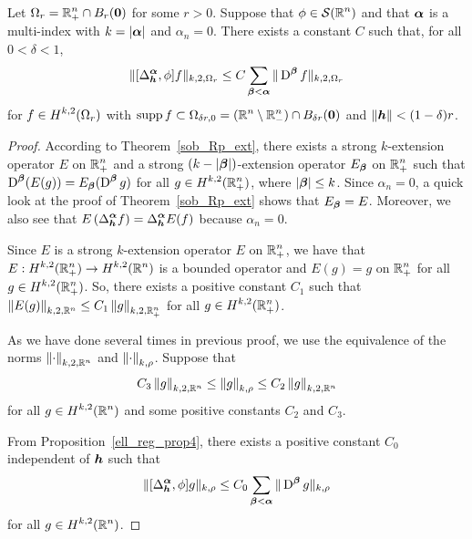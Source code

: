 \begin{cor} \label{ell_reg_cor2}
Let $\displaystyle \Omega_r = \mathbb{R}^n_+ \cap B_r({\bm{0}})$ for some $r>0$.
Suppose that $\displaystyle \phi \in \mathcal{S}(\mathbb{R}^n)$
and that ${\bm{\alpha}}$ is a multi-index with $k = |{\bm{\alpha}}|$ and
$\alpha_n=0$.  There exists a constant $C$ such that, for all $0 < \delta <1$,
\begin{equation} \label{ellRegCor2Eq1}
\| [\Delta^{{\bm{\alpha}}}_{{\bm{h}}}, \phi] f \|_{k,2,\Omega_r} \leq C
\sum_{{\bm{\beta}}<{\bm{\alpha}}} \| \operatorname{D}^{{\bm{\beta}}} f\|_{k,2,\Omega_r}
\end{equation}
for $\displaystyle f \in H^{k,2}(\Omega_r)$ with
$\displaystyle \operatorname{supp} f \subset \Omega_{\delta r,0}
= (\mathbb{R}^n \setminus \mathbb{R}^n_-) \cap B_{\delta r}({\bm{0}})$ and
$\|{\bm{h}}\|<(1-\delta)r$.
\end{cor}

\begin{proof}
According to Theorem~\ref{sob_Rp_ext}, there exists a strong
$k$-extension operator $E$ on $\displaystyle \mathbb{R}^n_+ $ and a strong
$(k-|{\bm{\beta}}|)$-extension operator $E_{{\bm{\beta}}}$ on
$\displaystyle \mathbb{R}^n_+$ such that
$\displaystyle \operatorname{D}^{{\bm{\beta}}} (E(g)) = E_{{\bm{\beta}}}(\operatorname{D}^{{\bm{\beta}}} g)$
for all $\displaystyle g \in H^{k,2}(\mathbb{R}^n_+)$, where
$|{\bm{\beta}}|\leq k$.  Since $\alpha_n=0$, a quick look at the proof of
Theorem~\ref{sob_Rp_ext} shows that $E_{{\bm{\beta}}} = E$.
Moreover, we also see that 
$\displaystyle E\left( \Delta^{{\bm{\alpha}}}_{{\bm{h}}} f\right) =
\Delta^{{\bm{\alpha}}}_{{\bm{h}}} E(f)$ because $\alpha_n=0$.

Since $E$ is a strong $k$-extension operator $E$ on
$\displaystyle \mathbb{R}^n_+ $, we
have that $\displaystyle E:H^{k,2}(\mathbb{R}^n_+) \to H^{k,2}(\mathbb{R}^n)$ is a
bounded operator and $E(g) = g$ on $\displaystyle \mathbb{R}^n_+$ for all
$\displaystyle g \in H^{k,2}(\mathbb{R}^n_+)$.  So, there exists a
positive constant $C_1$ such that
$\displaystyle \left\| E(g) \right\|_{k,2,\mathbb{R}^n} \leq C_1
\left\| g \right\|_{k,2,\mathbb{R}^n_+}$ for all $\displaystyle g \in H^{k,2}(\mathbb{R}^n_+)$.

As we have done several times in previous proof,
we use the equivalence of the norms
$\displaystyle \left\|\cdot\right\|_{k,2,\mathbb{R}^n}$ and 
$\displaystyle \left\|\cdot\right\|_{k,\rho}$.  Suppose that
\[
C_3 \left\|g \right\|_{k,2,\mathbb{R}^n} \leq \left\|g \right\|_{k,\rho}
\leq C_2 \left\|g \right\|_{k,2,\mathbb{R}^n}
\]
for all $\displaystyle g \in H^{k,2}(\mathbb{R}^n)$ and some positive
constants $C_2$ and $C_3$.

From Proposition~\ref{ell_reg_prop4}, there exists a positive constant $C_0$
independent of ${\bm{h}}$ such that
\[
\| [\Delta^{{\bm{\alpha}}}_{{\bm{h}}}, \phi] g \|_{k,\rho} \leq C_0
\sum_{{\bm{\beta}}<{\bm{\alpha}}} \| \operatorname{D}^{{\bm{\beta}}} g\|_{k,\rho}
\]
for all $\displaystyle g \in H^{k,2}(\mathbb{R}^n)$.


\end{proof}
